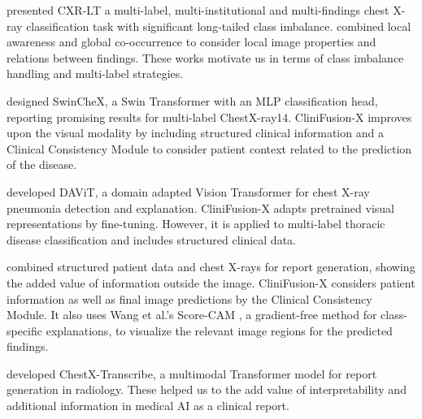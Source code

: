 \documentclass[conference]{IEEEtran}
\begin{document}
\citet{holste2024cxrlt} presented CXR-LT a multi-label, multi-institutional and multi-findings chest X-ray classification task with significant long-tailed class imbalance. \citet{wang2024multilabel} combined local awareness and global co-occurrence to consider local image properties and relations between findings. These works motivate us in terms of class imbalance handling and multi-label strategies.

\citet{swinchex2022} designed SwinCheX, a Swin Transformer with an MLP classification head, reporting promising results for multi-label ChestX-ray14. CliniFusion-X improves upon the visual modality by including structured clinical information and a Clinical Consistency Module to consider patient context related to the prediction of the disease.

\citet{fu2025davit} developed DAViT, a domain adapted Vision Transformer for chest X-ray pneumonia detection and explanation. CliniFusion-X adapts pretrained visual representations by fine-tuning. However, it is applied to multi-label thoracic disease classification and includes structured clinical data.

\citet{aksoy2024beyond} combined structured patient data and chest X-rays for report generation, showing the added value of information outside the image. CliniFusion-X considers patient information as well as final image predictions by the Clinical Consistency Module. It also uses Wang et al.'s Score-CAM \citep{wang2020scorecam}, a gradient-free method for class-specific explanations, to visualize the relevant image regions for the predicted findings.

\citet{singh2025chestxtranscribe} developed ChestX-Transcribe, a multimodal Transformer model for report generation in radiology. These helped us to the add value of interpretability and additional information in medical AI as a clinical report.
\end{document}

